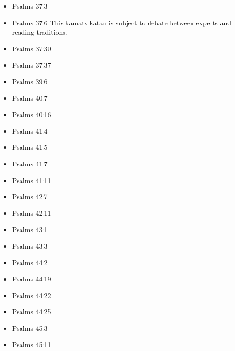 \documentclass[14pt]{book}
\begin{document}
\begin{multicols}{2}
\begin{itemize}
\item Psalms 37:3

\item Psalms 37:6 This kamatz katan is subject to debate between experts and reading traditions.

\item Psalms 37:30

\item Psalms 37:37

\item Psalms 39:6

\item Psalms 40:7

\item Psalms 40:16

\item Psalms 41:4

\item Psalms 41:5

\item Psalms 41:7

\item Psalms 41:11

\item Psalms 42:7

\item Psalms 42:11

\item Psalms 43:1

\item Psalms 43:3

\item Psalms 44:2

\item Psalms 44:19

\item Psalms 44:22

\item Psalms 44:25

\item Psalms 45:3

\item Psalms 45:11


\end{itemize}
\end{multicols}
\end{document}

